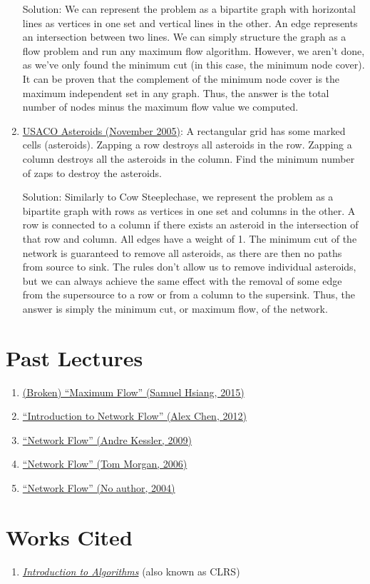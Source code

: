 \documentclass[11pt, oneside]{article}
\begin{document}
\begin{enumerate}
   Solution: We can represent the problem as a bipartite graph with horizontal lines as vertices in one set and vertical lines in the other. An edge represents an intersection between two lines. We can simply structure the graph as a flow problem and run any maximum flow algorithm. However, we aren't done, as we've only found the minimum cut (in this case, the minimum node cover). It can be proven that the complement of the minimum node cover is the maximum independent set in any graph. Thus, the answer is the total number of nodes minus the maximum flow value we computed.

   \item \href{http://poj.org/problem?id=3041}{USACO Asteroids (November 2005)}: A rectangular grid has some marked cells (asteroids). Zapping a row destroys all asteroids in the row. Zapping a column destroys all the asteroids in the column. Find the minimum number of zaps to destroy the asteroids.

   Solution: Similarly to Cow Steeplechase, we represent the problem as a bipartite graph with rows as vertices in one set and columns in the other. A row is connected to a column if there exists an asteroid in the intersection of that row and column. All edges have a weight of 1. The minimum cut of the network is guaranteed to remove all asteroids, as there are then no paths from source to sink. The rules don't allow us to remove individual asteroids, but we can always achieve the same effect with the removal of some edge from the supersource to a row or from a column to the supersink. Thus, the answer is simply the minimum cut, or maximum flow, of the network.

\end{enumerate}

\section{Past Lectures}

\begin{enumerate}
   \item \href{https://activities.tjhsst.edu/sct/lectures/1516/SCT_Maximum_Flow.pdf}{(Broken) ``Maximum Flow'' (Samuel Hsiang, 2015)}
   \item \href{https://activities.tjhsst.edu/sct/lectures/1112/networkflow.pdf}{``Introduction to Network Flow'' (Alex Chen, 2012)}
   \item \href{https://activities.tjhsst.edu/sct/lectures/0910/network_flow.pdf}{``Network Flow'' (Andre Kessler, 2009)}
   \item \href{https://activities.tjhsst.edu/sct/lectures/0607/netflownew.pdf}{``Network Flow'' (Tom Morgan, 2006)}
   \item \href{https://activities.tjhsst.edu/sct/lectures/0304/netflow.pdf}{``Network Flow'' (No author, 2004)}
\end{enumerate}

\section{Works Cited}

\begin{enumerate}
   \item \href{https://mitpress.mit.edu/books/introduction-algorithms-third-edition}{\textit{Introduction to Algorithms}} (also known as CLRS)
\end{enumerate}
\end{document}
